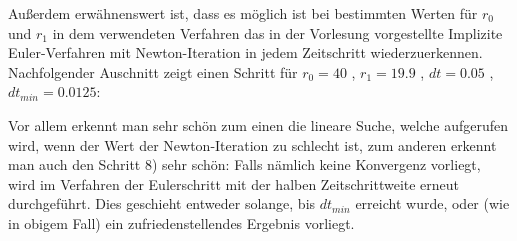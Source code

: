 Außerdem erwähnenswert ist, dass es möglich ist bei bestimmten Werten für $r_0$ und $r_1$ in dem verwendeten Verfahren das in der Vorlesung vorgestellte Implizite Euler-Verfahren mit Newton-Iteration in jedem Zeitschritt wiederzuerkennen.
Nachfolgender Auschnitt zeigt einen Schritt für $r_0 = 40$ , $r_1=19.9$ , $dt = 0.05$ , $dt_{min}=0.0125$:
\begin{figure}[H]
	\centering
\end{figure}
Vor allem erkennt man sehr schön zum einen die lineare Suche, welche aufgerufen wird, wenn der Wert der Newton-Iteration zu schlecht ist, zum anderen erkennt man auch den Schritt 8) sehr schön: 
Falls nämlich keine Konvergenz vorliegt, wird im Verfahren der Eulerschritt mit der halben Zeitschrittweite erneut durchgeführt. Dies geschieht entweder solange, bis $dt_{min}$ erreicht wurde, oder (wie in obigem Fall) ein zufriedenstellendes Ergebnis vorliegt.
